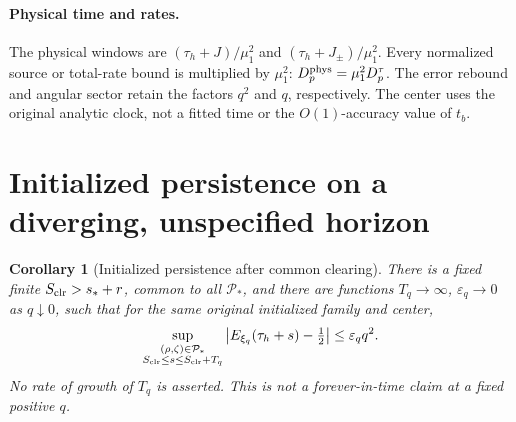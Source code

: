 \documentclass[11pt]{article}
\numberwithin{equation}{section}
\newtheorem{corollary}[theorem]{Corollary}
\begin{document}
\paragraph{Physical time and rates.}
The physical windows are
\((\tau_h+J)/\mu_1^2\) and
\((\tau_h+J_\pm)/\mu_1^2\). Every normalized source or total-rate
bound is multiplied by \(\mu_1^2\):
\(D_p^{\rm phys}=\mu_1^2D_p^\tau\).
The error rebound and angular sector retain the factors \(q^2\)
and \(q\), respectively. The center uses the original analytic
clock, not a fitted time or the \(O(1)\)-accuracy value of \(t_b\).

\section{Initialized persistence on a diverging, unspecified horizon}
\label{an07rtav1:persistencesection}
\begin{corollary}[Initialized persistence after common clearing]
\label{an07rtav1:persistence}
There is a fixed finite \(S_{\rm clr}>s_*+r\), common to all
\(\mathcal P_*\), and there are functions \(T_q\to\infty\),
\(\varepsilon_q\to0\) as \(q\downarrow0\), such that for the
same original initialized family and center,
\begin{equation}
 \sup_{\substack{(\rho,\zeta)\in\mathcal P_*\\
                   S_{\rm clr}\le s\le S_{\rm clr}+T_q}}
 \left|E_{\xi_q}(\tau_h+s)-\tfrac12\right|
                       \le\varepsilon_q q^2.
 \label{an07rtav1:persistencebound}
\end{equation}
No rate of growth of \(T_q\) is asserted. This is not a
forever-in-time claim at a fixed positive \(q\).
\end{corollary}
\end{document}
